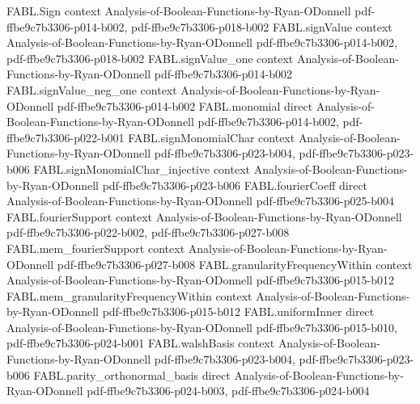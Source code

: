\begin{theorem}
\label{FABL.fourierSquareFunctional_affine_le}
\leanok
{}
\proofstep
  {FABL.Sign}
  {context}
  {Analysis-of-Boolean-Functions-by-Ryan-ODonnell}
  {pdf-ffbe9c7b3306-p014-b002,
    pdf-ffbe9c7b3306-p018-b002}
\proofstep
  {FABL.signValue}
  {context}
  {Analysis-of-Boolean-Functions-by-Ryan-ODonnell}
  {pdf-ffbe9c7b3306-p014-b002,
    pdf-ffbe9c7b3306-p018-b002}
\proofstep
  {FABL.signValue_one}
  {context}
  {Analysis-of-Boolean-Functions-by-Ryan-ODonnell}
  {pdf-ffbe9c7b3306-p014-b002}
\proofstep
  {FABL.signValue_neg_one}
  {context}
  {Analysis-of-Boolean-Functions-by-Ryan-ODonnell}
  {pdf-ffbe9c7b3306-p014-b002}
\proofstep
  {FABL.monomial}
  {direct}
  {Analysis-of-Boolean-Functions-by-Ryan-ODonnell}
  {pdf-ffbe9c7b3306-p014-b002,
    pdf-ffbe9c7b3306-p022-b001}
\proofstep
  {FABL.signMonomialChar}
  {context}
  {Analysis-of-Boolean-Functions-by-Ryan-ODonnell}
  {pdf-ffbe9c7b3306-p023-b004,
    pdf-ffbe9c7b3306-p023-b006}
\proofstep
  {FABL.signMonomialChar_injective}
  {context}
  {Analysis-of-Boolean-Functions-by-Ryan-ODonnell}
  {pdf-ffbe9c7b3306-p023-b006}
\proofstep
  {FABL.fourierCoeff}
  {direct}
  {Analysis-of-Boolean-Functions-by-Ryan-ODonnell}
  {pdf-ffbe9c7b3306-p025-b004}
\proofstep
  {FABL.fourierSupport}
  {context}
  {Analysis-of-Boolean-Functions-by-Ryan-ODonnell}
  {pdf-ffbe9c7b3306-p022-b002,
    pdf-ffbe9c7b3306-p027-b008}
\proofstep
  {FABL.mem_fourierSupport}
  {context}
  {Analysis-of-Boolean-Functions-by-Ryan-ODonnell}
  {pdf-ffbe9c7b3306-p027-b008}
\proofstep
  {FABL.granularityFrequencyWithin}
  {context}
  {Analysis-of-Boolean-Functions-by-Ryan-ODonnell}
  {pdf-ffbe9c7b3306-p015-b012}
\proofstep
  {FABL.mem_granularityFrequencyWithin}
  {context}
  {Analysis-of-Boolean-Functions-by-Ryan-ODonnell}
  {pdf-ffbe9c7b3306-p015-b012}
\proofstep
  {FABL.uniformInner}
  {direct}
  {Analysis-of-Boolean-Functions-by-Ryan-ODonnell}
  {pdf-ffbe9c7b3306-p015-b010,
    pdf-ffbe9c7b3306-p024-b001}
\proofstep
  {FABL.walshBasis}
  {context}
  {Analysis-of-Boolean-Functions-by-Ryan-ODonnell}
  {pdf-ffbe9c7b3306-p023-b004,
    pdf-ffbe9c7b3306-p023-b006}
\proofstep
  {FABL.parity_orthonormal_basis}
  {direct}
  {Analysis-of-Boolean-Functions-by-Ryan-ODonnell}
  {pdf-ffbe9c7b3306-p024-b003,
    pdf-ffbe9c7b3306-p024-b004}
\proofstep

\end{theorem}
